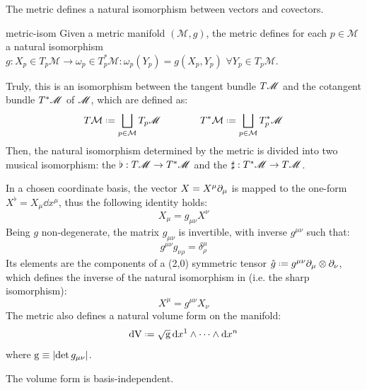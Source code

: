 The metric defines a natural isomorphism between vectors and covectors.

\begin{proposition}{}{metric-isom}
  Given a metric manifold $ (\mathcal{M},g) $, the metric defines for each $ p \in \mathcal{M} $ a natural isomorphism $ g : X_p \in T_p \mathcal{M} \rightarrow \omega_p \in T^*_p \mathcal{M} : \omega_p(Y_p) = g(X_p,Y_p) \,\,\forall Y_p \in T_p \mathcal{M} $.
\end{proposition}

Truly, this is an isomorphism between the tangent bundle $ T\mathscr{M} $ and the cotangent bundle $ T^*\mathscr{M} $ of $ \mathscr{M} $, which are defined as:
\begin{equation}
  T\mat \defeq \bigsqcup_{p \in \mat} T_p \man
  \qquad \qquad
  T^*\mat \defeq \bigsqcup_{p \in \mat} T_p^* \man
\end{equation}
Then, the natural isomorphism determined by the metric is divided into two musical isomorphism: the  $ \flat : T\mathscr{M} \rightarrow T^*\mathscr{M} $ and the  $ \sharp : T^*\mathscr{M} \rightarrow T\mathscr{M} $.

In a chosen coordinate basis, the vector $ X = X^{\mu} \partial_{\mu} $ is mapped to the one-form $ X^\flat = X_{\mu} \dd x^{\mu} $, thus the following identity holds:
\begin{equation}
  X_{\mu} = g_{\mu \nu} X^{\nu}
\end{equation}
Being $ g $ non-degenerate, the matrix $ g_{\mu \nu} $ is invertible, with inverse $ g^{\mu \nu} $ such that:
\begin{equation}
  g^{\mu \nu} g_{\nu \rho} = \delta^{\mu}_{\rho}
\end{equation}
Its elements are the components of a (2,0) symmetric tensor $ \hat{g} \defeq g^{\mu \nu} \pa_{\mu} \otimes \pa_{\nu} $, which defines the inverse of the natural isomorphism in  (i.e. the sharp isomorphism):
\begin{equation}
  X^{\mu} = g^{\mu \nu} X_{\nu}
\end{equation}
The metric also defines a natural volume form on the manifold:
\begin{equation}
  \volf \defeq \sqg\, \dd x^1 \wedge \dots \wedge \dd x^n
  \label{eq:volume-form}
\end{equation}
where $ \mathrm{g} \equiv \left\lvert\det g_{\mu \nu}\right\rvert $.

\begin{proposition}{}{}
  The volume form is basis-independent.
\end{proposition}

